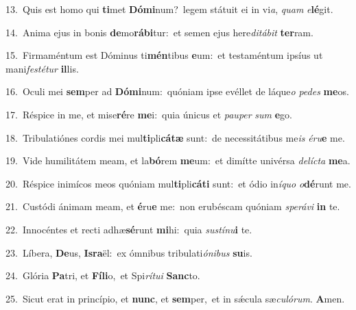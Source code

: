 {\numbfont\textcolor{\numbcolor}{13.}}~Quis est homo qui \textbf{ti}\-met \textbf{Dó}\-\textbf{mi}num?~\star legem státuit ei in vi\-\textit{a}\-, \textit{quam} \textit{e}\-\textbf{lé}git.\par
{\numbfont\textcolor{\numbcolor}{14.}}~Anima ejus in bonis \textbf{de}\-mo\-\textbf{rá}\-\textbf{bi}tur:~\star et semen ejus here\-\textit{di}\-\textit{tá}\textit{bit} \textbf{ter}\-ram.\par
{\numbfont\textcolor{\numbcolor}{15.}}~Firmaméntum est Dóminus ti\-\textbf{mén}\-tibus \textbf{e}\-um:~\star et testaméntum ipsíus ut mani\-\textit{fes}\-\textit{té}\textit{tur} \textbf{il}\-lis.\par
{\numbfont\textcolor{\numbcolor}{16.}}~Oculi mei \textbf{sem}\-per ad \textbf{Dó}\-\textbf{mi}num:~\star quóniam ipse evéllet de láque\textit{o} \textit{pe}\-\textit{des} \textbf{me}\-os.\par
{\numbfont\textcolor{\numbcolor}{17.}}~Réspice in me, et mise\-\textbf{ré}\-re \textbf{me}\-i:~\star quia únicus et \textit{pau}\-\textit{per} \textit{sum} \textbf{e}\-go.\par
{\numbfont\textcolor{\numbcolor}{18.}}~Tribulatiónes cordis mei mul\-\textbf{ti}\-pli\-\textbf{cá}\-\textbf{tæ} sunt:~\star de necessitátibus me\textit{is} \textit{é}\-\textit{ru}\textbf{e} me.\par
{\numbfont\textcolor{\numbcolor}{19.}}~Vide humilitátem meam, et la\-\textbf{bó}\-rem \textbf{me}\-um:~\star et dimítte univérsa \textit{de}\-\textit{líc}\textit{ta} \textbf{me}\-a.\par
{\numbfont\textcolor{\numbcolor}{20.}}~Réspice inimícos meos quóniam mul\-\textbf{ti}\-pli\-\textbf{cá}\-\textbf{ti} sunt:~\star et ódio in\-\textit{í}\-\textit{quo} \textit{o}\-\textbf{dé}runt me.\par
{\numbfont\textcolor{\numbcolor}{21.}}~Custódi ánimam meam, et \textbf{é}\-ru\textbf{e} me:~\star non erubéscam quóniam \textit{spe}\-\textit{rá}\textit{vi} \textbf{in} te.\par
{\numbfont\textcolor{\numbcolor}{22.}}~Innocéntes et recti adhæ\-\textbf{sé}\-runt \textbf{mi}\-hi:~\star quia \textit{sus}\-\textit{tí}\textit{nu}\textbf{i} te.\par
{\numbfont\textcolor{\numbcolor}{23.}}~Líbera, \textbf{De}\-us, \textbf{Is}\-\textbf{ra}ël:~\star ex ómnibus tribulati\-\textit{ó}\-\textit{ni}\textit{bus} \textbf{su}\-is.\par
{\numbfont\textcolor{\numbcolor}{24.}}~Glória \textbf{Pa}\-tri, et \textbf{Fí}\-\textbf{li}o,~\star et Spi\-\textit{rí}\-\textit{tu}\textit{i} \textbf{Sanc}\-to.\par
{\numbfont\textcolor{\numbcolor}{25.}}~Sicut erat in princípio, et \textbf{nunc}\-, et \textbf{sem}\-per,~\star et in sǽcula sæ\-\textit{cu}\-\textit{ló}\textit{rum}. \textbf{A}\-men.\par
